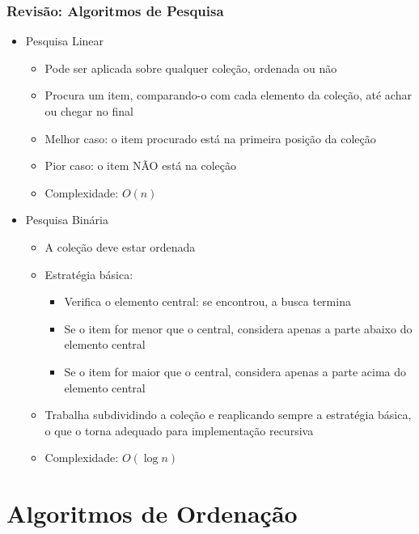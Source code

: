 \documentclass[aspectratio=169]{beamer}
\begin{document}
\begin{frame}\frametitle{Revisão: Algoritmos de Pesquisa}
\begin{itemize}
	\item Pesquisa Linear
	\begin{itemize}
		\item Pode ser aplicada sobre qualquer coleção, ordenada ou não
		\item Procura um item, comparando-o com cada elemento da coleção, até achar ou chegar no final
		\item Melhor caso: o item procurado está na primeira posição da coleção
		\item Pior caso: o item NÃO está na coleção
		\item Complexidade: $O(n)$
	\end{itemize}
	\item Pesquisa Binária
	\begin{itemize}
		\item A coleção deve estar ordenada
		\item Estratégia básica:
		\begin{itemize}
			\item Verifica o elemento central: se encontrou, a busca termina
			\item Se o item for menor que o central, considera apenas a parte abaixo do elemento central
			\item Se o item for maior que o central, considera apenas a parte acima do elemento central
		\end{itemize}
		\item Trabalha subdividindo a coleção e reaplicando sempre a estratégia básica, o que o torna adequado para implementação recursiva
		\item Complexidade: $O(\log n)$
	\end{itemize}
\end{itemize}
\end{frame}

\section{Algoritmos de Ordenação}
\end{document}
